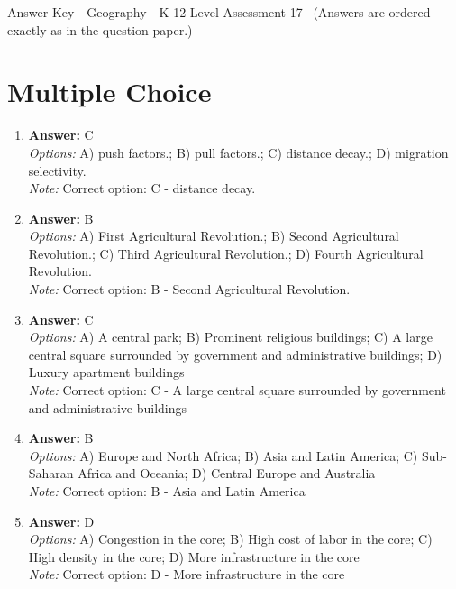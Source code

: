 \documentclass[12pt]{article}
\begin{document}
\begin{center}
Answer Key - Geography - K-12 Level Assessment 17 \
\small (Answers are ordered exactly as in the question paper.)
\end{center}

\section*{Multiple Choice}
\begin{enumerate}[label=\arabic*.]
\item \textbf{Answer:} C
\\ \textit{Options:} A) push factors.; B) pull factors.; C) distance decay.; D) migration selectivity.
\\ \textit{Note:} Correct option: C - distance decay.
\item \textbf{Answer:} B
\\ \textit{Options:} A) First Agricultural Revolution.; B) Second Agricultural Revolution.; C) Third Agricultural Revolution.; D) Fourth Agricultural Revolution.
\\ \textit{Note:} Correct option: B - Second Agricultural Revolution.
\item \textbf{Answer:} C
\\ \textit{Options:} A) A central park; B) Prominent religious buildings; C) A large central square surrounded by government and administrative buildings; D) Luxury apartment buildings
\\ \textit{Note:} Correct option: C - A large central square surrounded by government and administrative buildings
\item \textbf{Answer:} B
\\ \textit{Options:} A) Europe and North Africa; B) Asia and Latin America; C) Sub-Saharan Africa and Oceania; D) Central Europe and Australia
\\ \textit{Note:} Correct option: B - Asia and Latin America
\item \textbf{Answer:} D
\\ \textit{Options:} A) Congestion in the core; B) High cost of labor in the core; C) High density in the core; D) More infrastructure in the core
\\ \textit{Note:} Correct option: D - More infrastructure in the core
\end{enumerate}
\end{document}
